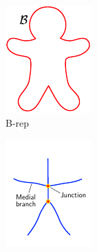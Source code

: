\begin{figure}[tbp]
\begin{subfigure}[b]{0.25\linewidth}
		\includegraphics[width=\textwidth]{figs/gingerbreadman_brep.pdf}
		\caption{B-rep}
		\label{fig:gbm:brep}
	\end{subfigure}
	\qquad%
	\begin{subfigure}[b]{0.25\linewidth}
		\centering
		\includegraphics[width=\textwidth]{figs/gingerbreadman_skeleton.pdf}

\end{subfigure}
\end{figure}
